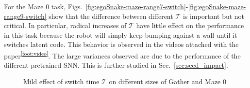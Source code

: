 \documentclass{article} %
\begin{document}
For the Maze 0 task, Figs.\ \ref{fig:egoSnake-maze-range7-switch}-\ref{fig:egoSnake-maze-range9-switch} show that the difference between different $\mathcal{T}$ is important but not critical. In particular, radical increases of $\mathcal{T}$ have little effect on the performance in this task because the robot will simply keep bumping against a wall until it switches latent code. This behavior is observed in the videos attached with the paper\textsuperscript{\ref{foot:video}}. The large variances observed are due to the performance of the different pretrained SNN. This is further studied in Sec.\ \ref{sec:seed_impact}.

\begin{figure}[h!]
	\centering
    \vspace{-10pt}    
	\caption{Mild effect of switch time $\mathcal{T}$ on different sizes of Gather and Maze 0}
	\label{fig:egoSnake-learning-curves-switch}
\end{figure}
\end{document}
